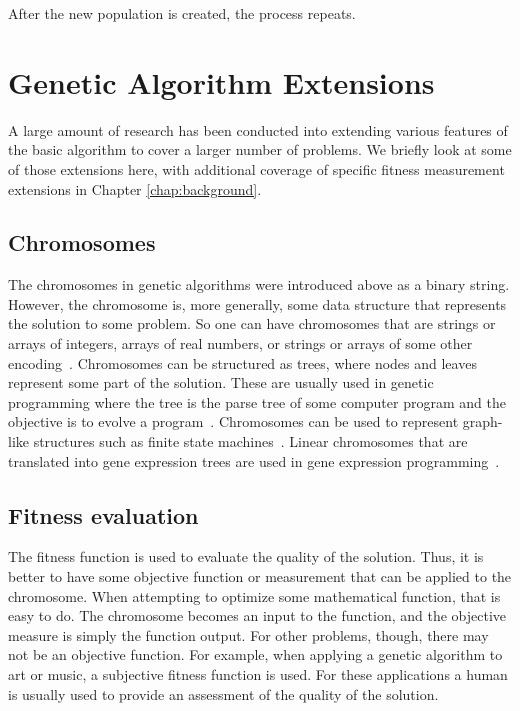 After the new population is created, the process repeats.

\section{Genetic Algorithm Extensions}

A large amount of research has been conducted into extending various features of
the basic algorithm to cover a larger number of problems. We briefly look at
some of those extensions here, with additional coverage of specific fitness
measurement extensions in Chapter \ref{chap:background}.

\subsection{Chromosomes}

The chromosomes in genetic algorithms were introduced above as a binary string.
However, the chromosome is, more generally, some data structure that represents
the solution to some problem. So one can have chromosomes that are strings or
arrays of integers, arrays of real numbers, or strings or arrays of some other
encoding~\cite{haupt2004practical}. Chromosomes can be structured as trees,
where nodes and leaves represent some part of the solution. These are usually
used in genetic programming where the tree is the parse tree of some computer
program and the objective is to evolve a program~\cite{koza1992genetic}.
Chromosomes can be used to represent graph-like structures such as finite state
machines~\cite{fogel1999intelligence,fogel2000evolutionary}. Linear chromosomes
that are translated into gene expression trees are used in gene expression
programming~\cite{ferreira2012gene}.

\subsection{Fitness evaluation}

The fitness function is used to evaluate the quality of the solution. Thus, it
is better to have some objective function or measurement that can be applied to
the chromosome. When attempting to optimize some mathematical function, that is
easy to do. The chromosome becomes an input to the function, and the objective
measure is simply the function output. For other problems, though, there may not
be an objective function. For example, when applying a genetic algorithm to art
or music, a subjective fitness function is used. For these applications a human
is usually used to provide an assessment of the quality of the solution.

